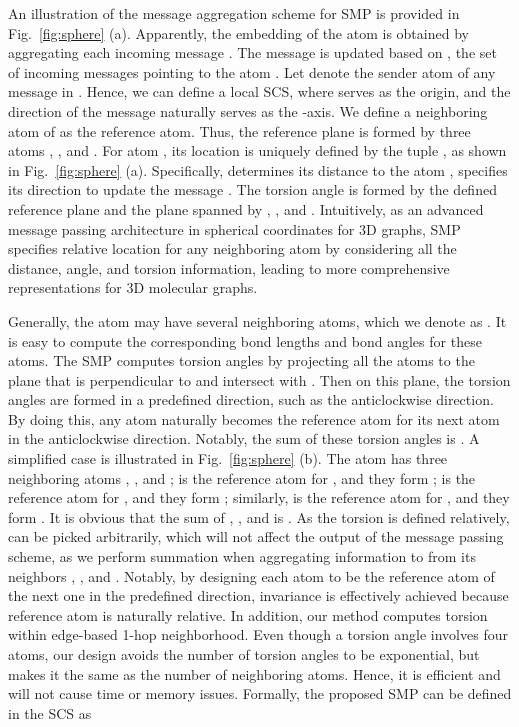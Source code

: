\documentclass{article}
\begin{document}
An illustration of the message aggregation scheme 
for SMP is provided in Fig.~\ref{fig:sphere} (a).
Apparently, the embedding of the atom  is
obtained by aggregating each incoming message .
The message  is updated based on ,
the set of incoming messages pointing to the atom .
Let  denote the sender atom of any message in .
Hence, we can define a local SCS,
where  serves as the origin,
and the direction of the message   naturally serves as the -axis.
We define a neighboring atom  of  as the reference atom. Thus, 
the reference plane is formed by three atoms , , and .
For atom , its location is uniquely defined by 
the tuple , as shown 
in Fig.~\ref{fig:sphere} (a).
Specifically, 
 determines its distance to the atom , 
specifies its direction to update the message .
The torsion angle  is formed by the defined reference plane and the plane spanned by , , and . Intuitively, as an advanced message passing architecture in spherical coordinates for 3D graphs, SMP specifies relative location for any neighboring atom  by considering all the distance, angle, and torsion information, leading to more comprehensive representations for 3D molecular graphs.

Generally, the atom  may have several neighboring atoms,
which we denote as .
It is easy to compute the corresponding bond lengths and bond angles for these  atoms.
The SMP computes torsion angles by projecting
all the  atoms to the plane that is perpendicular to 
and intersect with .
Then on this plane, the torsion angles are formed in a predefined direction, such as the anticlockwise direction.
By doing this, any atom naturally becomes the reference atom for its next atom
in the anticlockwise direction.
Notably, the sum of these  torsion angles is .
A simplified case is illustrated in Fig.~\ref{fig:sphere} (b).
The atom  has three neighboring atoms , , and ;
 is the reference atom for , and they form ;
 is the reference atom for , and they form ;
similarly,  is the reference atom for , and they form .
It is obvious that the sum of , , and  is .
\textcolor{COLOR}{As the torsion is defined relatively,  can be picked arbitrarily, which will not
affect the output of the message passing scheme, as we perform summation when aggregating information to  from its neighbors
, , and .}
Notably, by designing each atom to be the reference atom of the next one in the predefined direction,
invariance is effectively achieved because reference atom is naturally relative.
In addition, our method computes torsion within edge-based 1-hop neighborhood. 
Even though a torsion angle involves four atoms, 
our design avoids the number
of torsion angles to be exponential,
but makes it the same as the number of neighboring atoms.
Hence, it is efficient and will not cause time or memory issues.
Formally, the proposed SMP can be defined in the SCS as
\end{document}
